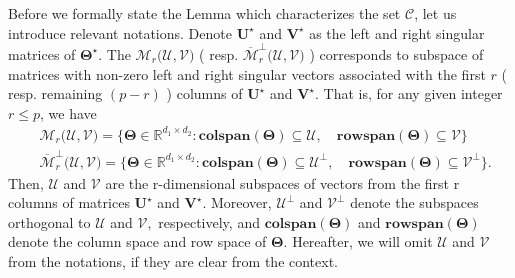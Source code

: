 \documentclass[alpha-refs]{wiley-article}
\begin{document}
Before we formally state the Lemma which characterizes the set $\mathcal{C}$, let us introduce relevant notations.
Denote $\boldsymbol{U}^{\star}$ and $\boldsymbol{V}^{\star}$ as the left and right singular matrices of $\boldsymbol{\Theta}^{\star}$.
The $\mathcal{M}_{r}\big( \mathcal{U}, \mathcal{V} \big)$ ( resp. $\overline{\mathcal{M}}_{r}^{\perp}\big( \mathcal{U}, \mathcal{V} \big)$ ) corresponds to subspace of matrices with non-zero left and right singular vectors associated with the first $r$ ( resp.  remaining $(p-r)$ ) columns of $\boldsymbol{U}^{\star}$ and $\boldsymbol{V}^{\star}$.
That is, for any given integer $r\leq p$, we have
\begin{align*}
    &\mathcal{M}_{r}\big( \mathcal{U}, \mathcal{V} \big) = \big\{ \boldsymbol{\Theta}\in\mathbb{R}^{d_{1} \times d_{2}} : \textbf{colspan}(\boldsymbol{\Theta}) \subseteq \mathcal{U},\quad  \textbf{rowspan}(\boldsymbol{\Theta}) \subseteq \mathcal{V}  \big\} \\
    &\overline{\mathcal{M}}_{r}^{\perp}\big( \mathcal{U}, \mathcal{V} \big) = \big\{ \boldsymbol{\Theta}\in\mathbb{R}^{d_{1} \times d_{2}} : \textbf{colspan}(\boldsymbol{\Theta}) \subseteq \mathcal{U}^{\perp},\quad  \textbf{rowspan}(\boldsymbol{\Theta}) \subseteq \mathcal{V}^{\perp} \big\}.
\end{align*}
Then, $\mathcal{U}$ and $\mathcal{V}$ are the r-dimensional subspaces of vectors from the first r columns of matrices $\boldsymbol{U}^{\star}$ and $\boldsymbol{V}^{\star}$.
Moreover, $\mathcal{U}^{\perp}$ and $\mathcal{V}^{\perp}$ denote the subspaces orthogonal to  $\mathcal{U}$ and $\mathcal{V},$ respectively, and $\textbf{colspan}(\boldsymbol{\Theta})$ and $\textbf{rowspan}(\boldsymbol{\Theta})$ denote the column space and row space of $\boldsymbol{\Theta}$.
Hereafter, we will omit $\mathcal{U}$ and $\mathcal{V}$ from the notations, if they are clear from the context.
\end{document}
